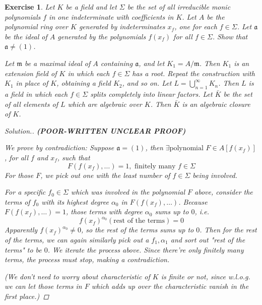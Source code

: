 \documentclass{article}
\theoremstyle{breakstyle}
\newtheorem{exercise}{Exercise}
\newenvironment{solution}
  {\begin{proof}[Solution.]\renewcommand{\qedsymbol}{}}
  {\end{proof}}
\begin{document}
\begin{exercise}
Let \(K\) be a field and let \(\Sigma\) be the set of all irreducible monic polynomials \(f\) in one indeterminate with coefficients in \(K\). Let \(A\) be the polynomial ring over \(K\) generated by indeterminates \(x_f\), one for each \(f\in\Sigma\). Let \(\mathfrak a\) be the ideal of \(A\) generated by the polynomials \(f(x_f)\) for all \(f\in\Sigma\). Show that \(\mathfrak a\neq(1)\).

Let \(\mathfrak m\) be a maximal ideal of \(A\) containing \(\mathfrak a\), and let \(K_1=A/\mathfrak m\). Then \(K_1\) is an extension field of \(K\) in which each \(f\in\Sigma\) has a root. Repeat the construction with \(K_1\) in place of \(K\), obtaining a field \(K_2\), and so on. Let \(L=\bigcup_{n=1}^{\infty}K_n\). Then \(L\) is a field in which each \(f\in\Sigma\) splits completely into linear factors. Let \(\bar K\) be the set of all elements of \(L\) which are algebraic over \(K\). Then \(\bar K\) is an algebraic closure of \(K\).

\begin{solution}
    \textbf{(POOR-WRITTEN UNCLEAR PROOF)}

        We prove by contradiction: Suppose $\mathfrak{a}=(1)$, then $\exists \text{polynomial }F\in A[f(x_{f})]$,
        for all $f$ and $x_{f}$,
        such that
        $$
        F(f(x_{f}),\ldots )=1,\text{ finitely many }f\in \Sigma
        $$
        For those $F$, we pick out one with the least number of $f\in \Sigma$ being involved.

        For a specific $f_0\in \Sigma$ which was involved in the polynomial $F$ above,
        consider the terms of $f_0$ with its highest degree $\alpha_0$ in $F(f(x_{f}),\ldots )$.
        Because $F(f(x_{f}),\ldots )=1$, those terms with degree $\alpha_0$ sums up to $0$, i.e.
        $$
        f(x_{f})^{\alpha_0}(\text{rest of the terms})=0
        $$
        Apparently $f(x_{f})^{\alpha_0}\neq 0$, so the rest of the terms sums up to $0$.
        Then for the rest of the terms, we can again similarly pick out a $f_1,\alpha_1$ and sort out "rest of the terms" to be $0$.
        We iterate the process above.
        Since there're only finitely many terms, the process must stop, making a contradiction.

        \emph{(We don't need to worry about characteristic of $K$ is finite or not, since w.l.o.g. we can let those terms in $F$ which adds up over the characteristic vanish in the first place.)}
\end{solution}
\end{exercise}
\end{document}
